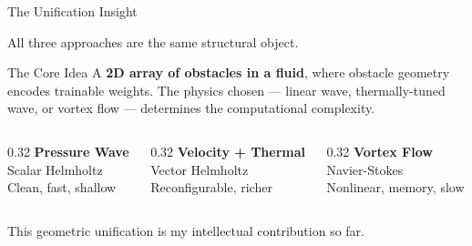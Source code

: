 \documentclass[aspectratio=169,11pt]{beamer}
\begin{document}
\begin{frame}{The Unification Insight}
  \begin{center}
    \textcolor{gdpPurple}{\large All three approaches are the same structural object.}
  \end{center}

  \vspace{0.2cm}
  \begin{block}{\footnotesize The Core Idea}
    \footnotesize
    A \textbf{2D array of obstacles in a fluid}, where obstacle geometry encodes trainable weights. The physics chosen --- linear wave, thermally-tuned wave, or vortex flow --- determines the computational complexity.
  \end{block}

  \vspace{0.2cm}
  \begin{columns}[T]
    \begin{column}{0.32\textwidth}
      \centering
      \textbf{Pressure Wave}\\[0.1cm]
      \footnotesize
      Scalar Helmholtz\\
      Clean, fast, shallow
    \end{column}
    \begin{column}{0.32\textwidth}
      \centering
      \textbf{Velocity + Thermal}\\[0.1cm]
      \footnotesize
      Vector Helmholtz\\
      Reconfigurable, richer
    \end{column}
    \begin{column}{0.32\textwidth}
      \centering
      \textbf{Vortex Flow}\\[0.1cm]
      \footnotesize
      Navier-Stokes\\
      Nonlinear, memory, slow
    \end{column}
  \end{columns}

  \vspace{0.3cm}
  \textcolor{gdpDarkBlue}{\small This geometric unification is my intellectual contribution so far.}
\end{frame}
\end{document}
